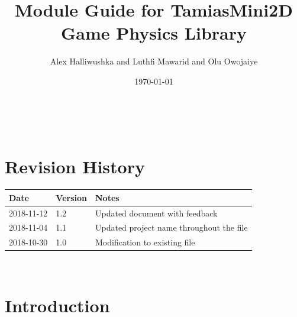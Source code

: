 \documentclass[12pt]{article}
\begin{document}
\title{Module Guide for TamiasMini2D Game Physics Library} 
\author{Alex Halliwushka and Luthfi Mawarid and Olu Owojaiye}
\date{\today}
	
\maketitle

~\newpage


\section{Revision History}

\begin{tabularx}{\textwidth}{p{3cm}p{2cm}X}
\toprule {\bf Date} & {\bf Version} & {\bf Notes}\\
\midrule
2018-11-12 & 1.2 & Updated document with feedback\\
2018-11-04 & 1.1 & Updated project name throughout the file\\
2018-10-30 & 1.0 & Modification to existing file\\
\bottomrule
\end{tabularx}

~\newpage

\tableofcontents

\listoftables

\listoffigures

\newpage



\section{Introduction}
\end{document}
